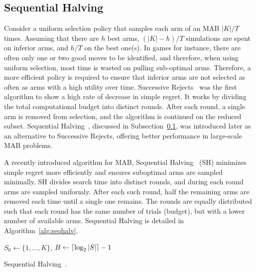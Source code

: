 \documentclass[a4paper]{llncs}
\DeclarePairedDelimiter{\ceil}{\lceil}{\rceil}
\DeclarePairedDelimiter{\floor}{\lfloor}{\rfloor}
\begin{document}
\subsection{Sequential Halving}
\label{subsec:seq_halving}

Consider a uniform selection policy that samples each arm of an MAB $|K|/T$ times. Assuming that there are $h$ best arms, $(|K|-h)/T$ simulations are spent on inferior arms, and $h/T$ on the best one(s). In games for instance, there are often only one or two good moves to be identified, and therefore, when using uniform selection, most time is wasted on pulling sub-optimal arms. Therefore, a more efficient policy is required to ensure that inferior arms are not selected as often as arms with a high utility over time. Successive Rejects~\cite{audibert2010best} was the first algorithm to show a high rate of decrease in simple regret. It works by dividing the total computational budget into distinct rounds. After each round, a single arm is removed from selection, and the algorithm is continued on the reduced subset. Sequential Halving~\cite{Karnin13SH}, discussed in Subsection~\ref{subsec:seq_halving}, was introduced later as an alternative to Successive Rejects, offering better performance in large-scale MAB problems.

A recently introduced algorithm for MAB, Sequential Halving~\cite{Karnin13SH} (SH) minimizes simple regret more efficiently and ensures suboptimal arms are sampled minimally. SH divides search time into distinct rounds, and during each round arms are sampled uniformly. After each such round, half the remaining arms are removed each time until a single one remains. The rounds are equally distributed such that each round has the same number of trials (budget), but with a lower number of available arms. Sequential Halving is detailed in Algorithm~\ref{alg:seqhalv}.

\IncMargin{1em}
\begin{algorithm2e}[ht]
	\vspace{0.1cm}
	$S_0 \gets \{1,\dots,K\}$,
	$B \gets \ceil{\log_2{|S|}} - 1$														\;
	\BlankLine
  \caption[Sequential Halving]{Sequential Halving~\protect\cite{Karnin13SH}. \label{alg:seqhalv}}
\end{algorithm2e}
\DecMargin{1em}
\end{document}
